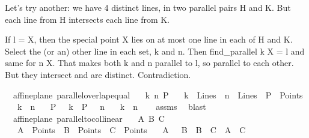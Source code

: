\begin{isabellebody}
\begin{isamarkuptext}
Let's try another: we have 4 distinct lines, in two parallel pairs H and K. But each line from 
H intersects each line from K. 

 If l = {X}, then the special point X lies on at most one line in each of H and K. Select 
the (or an) other line in each set, k and n. Then find_parallel k X = l and same for n X. 
That makes both k and n parallel to l, so parallel to each other. But they intersect and are 
distinct. Contradiction.%
\end{isamarkuptext}\isamarkuptrue%
\isamarkupfalse%
\ {\isacharparenleft}{\kern0pt}\ affine{\isacharunderscore}{\kern0pt}plane{\isacharparenright}{\kern0pt}\ parallel{\isacharunderscore}{\kern0pt}overlap{\isacharunderscore}{\kern0pt}equal{\isacharcolon}{\kern0pt}\isanewline
\ \ \ k\ n\ P\isanewline
\ \ \ {\isachardoublequoteopen}k\ {\isasymin}\ Lines\ {\isasymand}\ n\ {\isasymin}\ Lines\ {\isasymand}\ P\ {\isasymin}\ Points{\isachardoublequoteclose}\isanewline
\ \ \ {\isachardoublequoteopen}k\ {\isacharbar}{\kern0pt}{\isacharbar}{\kern0pt}\ n{\isachardoublequoteclose}\isanewline
\ \ \ {\isachardoublequoteopen}P\ {\isasymlhd}\ \ k{\isachardoublequoteclose}\ \ {\isachardoublequoteopen}P\ {\isasymlhd}\ \ n{\isachardoublequoteclose}\isanewline
\ \ \ {\isachardoublequoteopen}k\ {\isacharequal}{\kern0pt}\ n{\isachardoublequoteclose}\isanewline
%
\isadelimproof
\ \ %
\endisadelimproof
%
\isatagproof
{}\isamarkupfalse%
\ assms{\isacharparenleft}{\kern0pt}{}{\isacharcomma}{\kern0pt}{}{\isacharcomma}{\kern0pt}{}{\isacharcomma}{\kern0pt}{}{\isacharparenright}{\kern0pt}\ \isamarkupfalse%
\ blast%
\endisatagproof
{\isafoldproof}%
%
\isadelimproof
\isanewline
%
\endisadelimproof
\isanewline
\isanewline
{}\isamarkupfalse%
\ {\isacharparenleft}{\kern0pt}\ affine{\isacharunderscore}{\kern0pt}plane{\isacharparenright}{\kern0pt}\ parallel{\isacharunderscore}{\kern0pt}to{\isacharunderscore}{\kern0pt}collinear{\isacharcolon}{\kern0pt}\isanewline
\ \ \ A\ B\ C\isanewline
\ \ \ {\isachardoublequoteopen}A\ {\isasymin}\ Points\ {\isasymand}\ B\ {\isasymin}\ Points\ {\isasymand}\ C\ {\isasymin}\ Points{\isachardoublequoteclose}\isanewline
\ \ \ {\isachardoublequoteopen}A\ {\isasymnoteq}\ \ B\ {\isasymand}\ B\ {\isasymnoteq}\ C\ {\isasymand}\ A\ {\isasymnoteq}\ C{\isachardoublequoteclose}\isanewline

\end{isabellebody}
